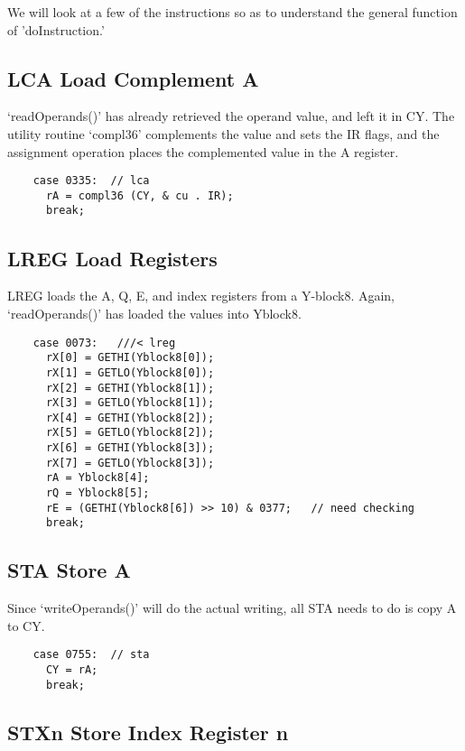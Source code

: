 \documentclass[notitlepage]{report}
\begin{document}
We will look at a few of the instructions so as to understand the
general function of 'doInstruction.'

\subsection{LCA Load Complement A}

`readOperands()' has already retrieved the operand value, and left it in CY.
The utility routine `compl36' complements the value and sets the IR flags,
and the assignment operation places the complemented value in the A register.

\begin{verbatim}
    case 0335:  // lca
      rA = compl36 (CY, & cu . IR);
      break;
\end{verbatim}

\subsection{LREG Load Registers}

LREG loads the A, Q, E, and index registers from a Y-block8. Again, 
`readOperands()' has loaded the values into Yblock8.

\begin{verbatim}
    case 0073:   ///< lreg
      rX[0] = GETHI(Yblock8[0]);
      rX[1] = GETLO(Yblock8[0]);
      rX[2] = GETHI(Yblock8[1]);
      rX[3] = GETLO(Yblock8[1]);
      rX[4] = GETHI(Yblock8[2]);
      rX[5] = GETLO(Yblock8[2]);
      rX[6] = GETHI(Yblock8[3]);
      rX[7] = GETLO(Yblock8[3]);
      rA = Yblock8[4];
      rQ = Yblock8[5];
      rE = (GETHI(Yblock8[6]) >> 10) & 0377;   // need checking
      break;
\end{verbatim}

\subsection{STA Store A}

Since `writeOperands()' will do the actual writing, all STA needs to
do is copy A to CY.

\begin{verbatim}
    case 0755:  // sta
      CY = rA;
      break;
\end{verbatim}

\subsection{STXn Store Index Register n}
\end{document}
